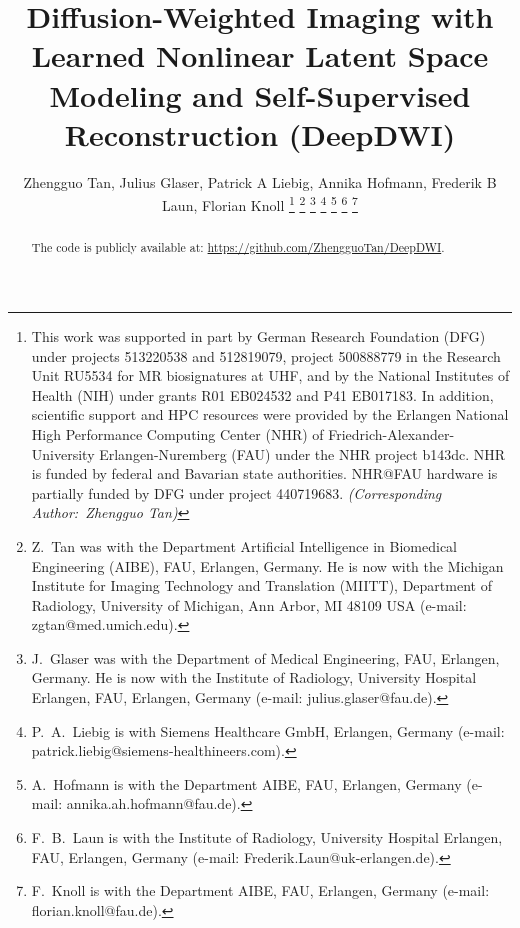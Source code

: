 \documentclass[journal,twoside,web]{ieeecolor}
\begin{document}
	\title{Diffusion-Weighted Imaging with Learned Nonlinear Latent Space Modeling and Self-Supervised Reconstruction (DeepDWI)}

	\author{Zhengguo Tan, Julius Glaser, Patrick A Liebig, Annika Hofmann, Frederik B Laun, Florian Knoll
		\thanks{This work was supported in part by
			German Research Foundation (DFG)
			under projects 513220538 and 512819079,
			project 500888779 in the Research Unit RU5534
			for MR biosignatures at UHF,
			and by the National Institutes of Health (NIH)
			under grants R01 EB024532 and P41 EB017183.
			In addition, scientific support and HPC resources
			were provided by
			the Erlangen National High Performance Computing Center (NHR)
			of Friedrich-Alexander-University Erlangen-Nuremberg (FAU)
			under the NHR project b143dc.
			NHR is funded by federal and Bavarian state authorities.
			NHR@FAU hardware is partially funded by
			DFG under project 440719683. \textit{(Corresponding Author:~Zhengguo Tan)}}
		\thanks{Z.~Tan was with the Department
			Artificial Intelligence in Biomedical Engineering (AIBE),
			FAU, Erlangen, Germany.
			He is now with
			the Michigan Institute for Imaging Technology and Translation
			(MIITT),
			Department of Radiology,
			University of Michigan, Ann Arbor, MI 48109 USA
			(e-mail: zgtan@med.umich.edu).}
		\thanks{J.~Glaser was with the Department of Medical Engineering,
			FAU, Erlangen, Germany.
			He is now with the Institute of Radiology,
			University Hospital Erlangen,
			FAU, Erlangen, Germany
			(e-mail: julius.glaser@fau.de).}
		\thanks{P.~A.~Liebig is with Siemens Healthcare GmbH, Erlangen, Germany
			(e-mail: patrick.liebig@siemens-healthineers.com).}
		\thanks{A.~Hofmann is with the Department AIBE,
			FAU, Erlangen, Germany
			(e-mail: annika.ah.hofmann@fau.de).}
		\thanks{F.~B.~Laun is with the Institute of Radiology,
			University Hospital Erlangen,
			FAU, Erlangen, Germany
			(e-mail: Frederik.Laun@uk-erlangen.de).}
		\thanks{F.~Knoll is with the Department AIBE,
			FAU, Erlangen, Germany
			(e-mail: florian.knoll@fau.de).}
	}

	\maketitle

	\begin{abstract}
		The code is publicly available at: \url{https://github.com/ZhengguoTan/DeepDWI}.
	\end{abstract}
\end{document}
